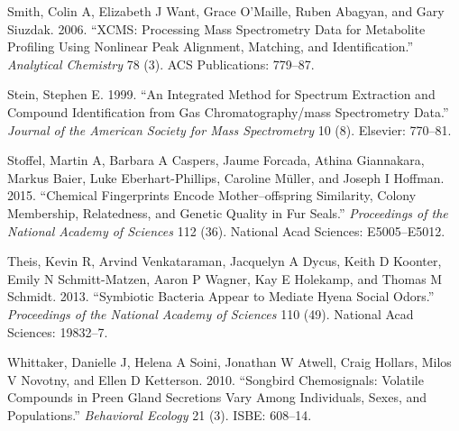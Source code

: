 \documentclass[]{article}
\begin{document}
\hypertarget{ref-smith2006xcms}{}
Smith, Colin A, Elizabeth J Want, Grace O'Maille, Ruben Abagyan, and
Gary Siuzdak. 2006. ``XCMS: Processing Mass Spectrometry Data for
Metabolite Profiling Using Nonlinear Peak Alignment, Matching, and
Identification.'' \emph{Analytical Chemistry} 78 (3). ACS Publications:
779--87.

\hypertarget{ref-stein1999integrated}{}
Stein, Stephen E. 1999. ``An Integrated Method for Spectrum Extraction
and Compound Identification from Gas Chromatography/mass Spectrometry
Data.'' \emph{Journal of the American Society for Mass Spectrometry} 10
(8). Elsevier: 770--81.

\hypertarget{ref-stoffel2015chemical}{}
Stoffel, Martin A, Barbara A Caspers, Jaume Forcada, Athina Giannakara,
Markus Baier, Luke Eberhart-Phillips, Caroline Müller, and Joseph I
Hoffman. 2015. ``Chemical Fingerprints Encode Mother--offspring
Similarity, Colony Membership, Relatedness, and Genetic Quality in Fur
Seals.'' \emph{Proceedings of the National Academy of Sciences} 112
(36). National Acad Sciences: E5005--E5012.

\hypertarget{ref-theis2013symbiotic}{}
Theis, Kevin R, Arvind Venkataraman, Jacquelyn A Dycus, Keith D Koonter,
Emily N Schmitt-Matzen, Aaron P Wagner, Kay E Holekamp, and Thomas M
Schmidt. 2013. ``Symbiotic Bacteria Appear to Mediate Hyena Social
Odors.'' \emph{Proceedings of the National Academy of Sciences} 110
(49). National Acad Sciences: 19832--7.

\hypertarget{ref-whittaker2010songbird}{}
Whittaker, Danielle J, Helena A Soini, Jonathan W Atwell, Craig Hollars,
Milos V Novotny, and Ellen D Ketterson. 2010. ``Songbird Chemosignals:
Volatile Compounds in Preen Gland Secretions Vary Among Individuals,
Sexes, and Populations.'' \emph{Behavioral Ecology} 21 (3). ISBE:
608--14.
\end{document}
